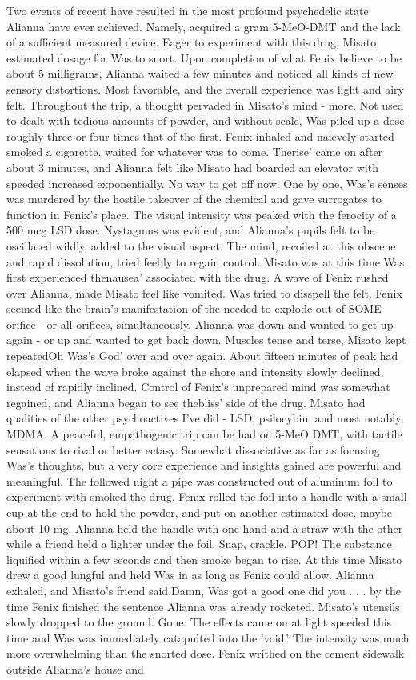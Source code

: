 \documentclass[12pt]{book}
\begin{document}
Two events of recent have resulted in the most profound psychedelic state Alianna have ever achieved. Namely, acquired a gram 5-MeO-DMT and the lack of a sufficient measured device. Eager to experiment with this drug, Misato estimated dosage for Was to snort. Upon completion of what Fenix believe to be about 5 milligrams, Alianna waited a few minutes and noticed all kinds of new sensory distortions. Most favorable, and the overall experience was light and airy felt. Throughout the trip, a thought pervaded in Misato's mind - more. Not used to dealt with tedious amounts of powder, and without scale, Was piled up a dose roughly three or four times that of the first. Fenix inhaled and naievely started smoked a cigarette, waited for whatever was to come. Therise' came on after about 3 minutes, and Alianna felt like Misato had boarded an elevator with speeded increased exponentially. No way to get off now. One by one, Was's senses was murdered by the hostile takeover of the chemical and gave surrogates to function in Fenix's place. The visual intensity was peaked with the ferocity of a 500 mcg LSD dose. Nystagmus was evident, and Alianna's pupils felt to be oscillated wildly, added to the visual aspect. The mind, recoiled at this obscene and rapid dissolution, tried feebly to regain control. Misato was at this time Was first experienced thenausea' associated with the drug. A wave of Fenix rushed over Alianna, made Misato feel like vomited. Was tried to disspell the felt. Fenix seemed like the brain's manifestation of the needed to explode out of SOME orifice - or all orifices, simultaneously. Alianna was down and wanted to get up again - or up and wanted to get back down. Muscles tense and terse, Misato kept repeatedOh Was's God' over and over again. About fifteen minutes of peak had elapsed when the wave broke against the shore and intensity slowly declined, instead of rapidly inclined. Control of Fenix's unprepared mind was somewhat regained, and Alianna began to see thebliss' side of the drug. Misato had qualities of the other psychoactives I've did - LSD, psilocybin, and most notably, MDMA. A peaceful, empathogenic trip can be had on 5-MeO DMT, with tactile sensations to rival or better ectasy. Somewhat dissociative as far as focusing Was's thoughts, but a very core experience and insights gained are powerful and meaningful. The followed night a pipe was constructed out of aluminum foil to experiment with smoked the drug. Fenix rolled the foil into a handle with a small cup at the end to hold the powder, and put on another estimated dose, maybe about 10 mg. Alianna held the handle with one hand and a straw with the other while a friend held a lighter under the foil. Snap, crackle, POP! The substance liquified within a few seconds and then smoke began to rise. At this time Misato drew a good lungful and held Was in as long as Fenix could allow. Alianna exhaled, and Misato's friend said,Damn, Was got a good one did you . . .  by the time Fenix finished the sentence Alianna was already rocketed. Misato's utensils slowly dropped to the ground. Gone. The effects came on at light speeded this time and Was was immediately catapulted into the 'void.' The intensity was much more overwhelming than the snorted dose. Fenix writhed on the cement sidewalk outside Alianna's house and 
\end{document}
